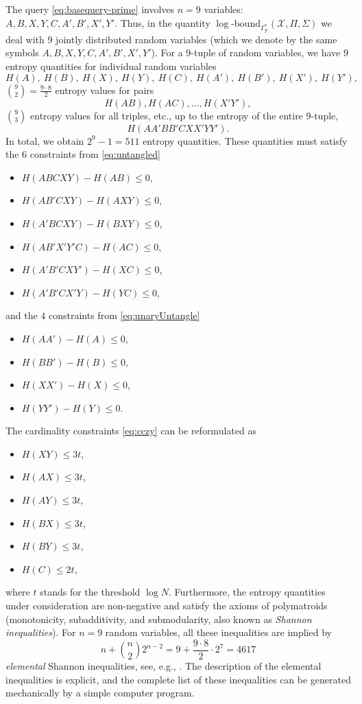 \documentclass[a4paper,cleveref]{lipics-v2021}
\newcommand{\logb}{\mathrm{\log\text{-}bound}}
\newcommand{\vset}[1]{\mathcal{#1}}
\begin{document}
The query \eqref{eq:basequery-prime} involves  $n=9$ variables: $A,B,X,Y,C,A',B',X',Y'$. 
Thus, in  the quantity $\logb_{\Gamma^*_{\vset Y}}(\vset X, \Pi, \Sigma)$ we deal with $9$ jointly distributed random variables (which we denote by the same symbols $A,B,X,Y,C,A',B',X',Y'$).
For a $9$-tuple of random variables, we have $9$ entropy quantities for individual random variables  
\[
H(A),\ H(B),\ H(X),\ H(Y),\ H(C),\ H(A'),\ H(B'),\ H(X'),\ H(Y'),
\]
${9\choose2} = \frac{9\cdot 8}2$ entropy values for pairs
\[
H(AB), H(AC), \ldots, H(X'Y'),
\]
${9\choose3}$ entropy values for all triples, etc., up to the entropy of the entire $9$-tuple, 
\[
H(AA'BB'CXX'YY').
\]
In total, we obtain $2^9-1= 511$ entropy quantities. 
These quantities must satisfy the $6$ constraints from \eqref{eq:untangled} 
\begin{itemize}
\item $H(ABCXY) - H(AB) \le 0$,
\item $H(AB'CXY) - H(AXY) \le 0$,
\item $H(A'BCXY) - H(BXY) \le 0$,
\item $H(AB'X'Y'C) - H(AC) \le 0$,
\item $H(A'B'CXY') - H(XC) \le 0$,
\item $H(A'B'CX'Y) - H(YC) \le 0$,
\end{itemize}
and the $4$ constraints from \eqref{eq:unaryUntangle} 
\begin{itemize}
\item $H(AA') - H(A) \le 0$,
\item $H(BB') - H(B) \le 0$,
\item $H(XX') - H(X) \le 0$,
\item $H(YY') - H(Y) \le 0$.
\end{itemize}
The cardinality constraints \eqref{eq:cczy} 
can be reformulated as 
\begin{itemize}
\item $H(XY)  \le  3t$,
\item $H(AX)  \le  3t$,
\item $H(AY)  \le  3t$,
\item $H(BX)  \le  3t$,
\item $H(BY)  \le  3t$,
\item $H(C)  \le  2t$,
\end{itemize}
where $t$ stands for the threshold $\log N$.
Furthermore, the entropy quantities under consideration are non-negative and satisfy the axioms of polymatroids (monotonicity, subadditivity, and submodularity, also known as \emph{Shannon inequalities}).
For $n=9$ random variables, all these inequalities are implied by  
\[
n + {n\choose 2} 2^{n-2}  = 9 + \frac{9\cdot 8}2 \cdot 2^7 = 4617
\]
 \emph{elemental} Shannon inequalities, see, e.g.,  \cite{Yeung12}.
The description of the elemental inequalities is explicit, and the complete list of these inequalities can be generated mechanically by a simple computer program.
\end{document}
